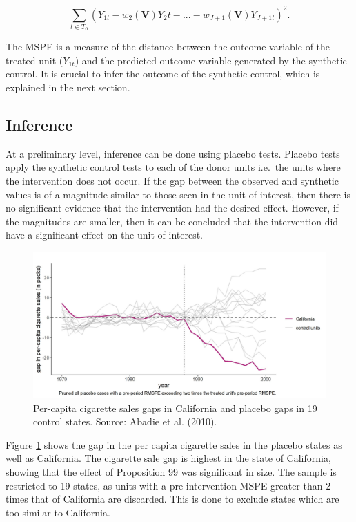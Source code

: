 \documentclass[12pt,nobind, a4paper]{reedthesis}
\begin{document}
 \[\sum_{t \in T_0}(Y_{1t}- w_{2}(\mathbf{V})Y_2{t}-...-w_{J+1}(\mathbf{V})Y_{J+1t})^2.\]

 The MSPE is a measure of the distance between the outcome variable of the treated unit (\(Y_{1t}\)) and the predicted outcome variable generated by the synthetic control. It is crucial to infer the outcome of the synthetic control, which is explained in the next section.

 \hypertarget{inference}{%
 \subsection{Inference}\label{inference}}

 At a preliminary level, inference can be done using placebo tests. Placebo tests apply the synthetic control tests to each of the donor units i.e.~the units where the intervention does not occur. If the gap between the observed and synthetic values is of a magnitude similar to those seen in the unit of interest, then there is no significant evidence that the intervention had the desired effect. However, if the magnitudes are smaller, then it can be concluded that the intervention did have a significant effect on the unit of interest.
 \begin{figure}

 {\centering \includegraphics[width=1\linewidth]{figure/calplacebo} 

 }

 \caption{Per-capita cigarette sales gaps in California and placebo gaps in 19 control states. Source: Abadie et al. (2010).}\label{fig:placebo}
 \end{figure}
 Figure \ref{fig:placebo} shows the gap in the per capita cigarette sales in the placebo states as well as California. The cigarette sale gap is highest in the state of California, showing that the effect of Proposition 99 was significant in size. The sample is restricted to 19 states, as units with a pre-intervention MSPE greater than 2 times that of California are discarded. This is done to exclude states which are too similar to California.
 \linebreak
\end{document}
